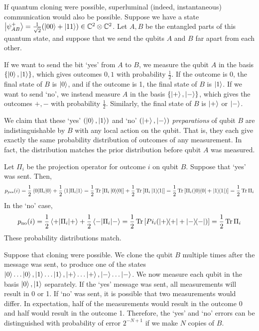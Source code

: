 If quantum cloning were possible, superluminal (indeed, instantaneous) communication would also be possible.
Suppose we have a state \( \ket{\psi^+_{AB}} = \frac{1}{\sqrt{2}} \qty(\ket{00} + \ket{11}) \in \mathbb C^2 \otimes \mathbb C^2 \).
Let \( A, B \) be the entangled parts of this quantum state, and suppose that we send the qubits \( A \) and \( B \) far apart from each other.

If we want to send the bit `yes' from \( A \) to \( B \), we measure the qubit \( A \) in the basis \( \qty{\ket{0}, \ket{1}} \), which gives outcomes \( 0, 1 \) with probability \( \frac{1}{2} \).
If the outcome is 0, the final state of \( B \) is \( \ket{0} \), and if the outcome is 1, the final state of \( B \) is \( \ket{1} \).
If we want to send `no', we instead measure \( A \) in the basis \( \qty{\ket{+}, \ket{-}} \), which gives the outcomes \( +, - \) with probability \( \frac{1}{2} \).
Similarly, the final state of \( B \) is \( \ket{+} \) or \( \ket{-} \).

We claim that these `yes' \( (\ket{0}, \ket{1}) \) and `no' \( (\ket{+}, \ket{-}) \) \emph{preparations} of qubit \( B \) are indistinguishable by \( B \) with any local action on the qubit.
That is, they each give exactly the same probability distribution of outcomes of any measurement.
In fact, the distribution matches the prior distribution before qubit \( A \) was measured.

Let \( \Pi_i \) be the projection operator for outcome \( i \) on qubit \( B \).
Suppose that `yes' was sent.
Then,
\[ p_{\text{yes}}(i) = \frac{1}{2}\ev{\Pi_i}{0} + \frac{1}{2}\ev{\Pi_i}{1} = \frac{1}{2} \Tr \qty[\Pi_i \op{0}{0}] + \frac{1}{2} \Tr \qty[\Pi_i \op{1}{1}] = \frac{1}{2} \Tr \qty[\Pi_i \qty(\op{0}{0} + \op{1}{1})] = \frac{1}{2} \Tr \Pi_i \]
In the `no' case,
\[ p_{\text{no}}(i) = \frac{1}{2}\ev{\Pi_i}{+} + \frac{1}{2}\ev{\Pi_i}{-} = \frac{1}{2} \Tr \qty[Pi_i \qty(\op{+}{+} + \op{-}{-})] = \frac{1}{2} \Tr \Pi_i \]
These probability distributions match.

Suppose that cloning were possible.
We clone the qubit \( B \) multiple times after the message was sent, to produce one of the states \( \ket{0} \dots \ket{0}, \ket{1} \dots \ket{1}, \ket{+} \dots \ket{+}, \ket{-} \dots \ket{-} \).
We now measure each qubit in the basis \( \ket{0}, \ket{1} \) separately.
If the `yes' message was sent, all measurements will result in 0 or 1.
If `no' was sent, it is possible that two measurements would differ.
In expectation, half of the measurements would result in the outcome 0 and half would result in the outcome 1.
Therefore, the `yes' and `no' errors can be distinguished with probability of error \( 2^{-N+1} \) if we make \( N \) copies of \( B \).

